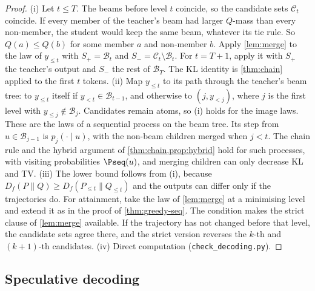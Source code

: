 \begin{proof}
(i) Let $t\le T$. The beams before level $t$ coincide, so the candidate sets $\mathcal C_t$ coincide. If every member
of the teacher's beam had larger $Q$-mass than every non-member, the student would keep the same beam,
whatever its tie rule. So $Q(a)\le Q(b)$ for some member $a$ and non-member $b$. Apply \cref{lem:merge} to the
law of $y_{\le t}$ with $S_+=\mathcal B_t$ and $S_-=\mathcal C_t\setminus\mathcal B_t$. For $t=T+1$, apply it with $S_+$ the teacher's
output and $S_-$ the rest of $\mathcal B_T$. The KL identity is \cref{thm:chain} applied to the first $t$ tokens.
(ii) Map $y_{\le t}$ to its path through the teacher's beam tree: to $y_{\le t}$ itself if $y_{<t}\in\mathcal B_{t-1}$, and
otherwise to $(j,y_{<j})$, where $j$ is the first level with $y_{\le j}\notin\mathcal B_j$. Candidates remain atoms, so
(i) holds for the image laws. These are the laws of a sequential process on the beam tree. Its step from
$u\in\mathcal B_{j-1}$ is $p_j(\cdot\mid u)$, with the non-beam children merged when $j<t$. The chain rule and the hybrid
argument of \cref{thm:chain,prop:hybrid} hold for such processes, with visiting probabilities $\Pseq(u)$, and
merging children can only decrease KL and TV.
(iii) The lower bound follows from (i), because $D_f(P\|Q)\ge D_f(P_{\le t}\|Q_{\le t})$ and the outputs can differ
only if the trajectories do. For attainment, take the law of \cref{lem:merge} at a minimising level and
extend it as in the proof of \cref{thm:greedy-seq}. The condition makes the strict clause of
\cref{lem:merge} available. If the trajectory has not changed before that level, the candidate sets
agree there, and the strict version reverses the $k$-th and $(k+1)$-th candidates.
(iv) Direct computation (\texttt{check\_decoding.py}).
\end{proof}

\subsection{Speculative decoding}

